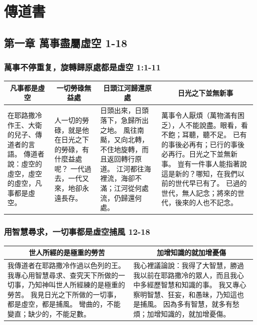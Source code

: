 \chapter{傳道書}

\section{第一章 萬事盡屬虛空 1-18}
\subsection{萬事不停重复，旋轉歸原處都是虛空  1:1-11}
\begin{table}[H]
\centering
\begin{tabular}{p{2.75cm}|p{2.50cm}|p{4.250cm}|p{}}\hline\hline
\multicolumn{1}{c|}{凡事都是虛空}&\multicolumn{1}{c|}{一切勞碌無益處}&\multicolumn{1}{c|}{日頭江河歸還原處}&\multicolumn{1}{c}{日光之下並無新事}\\\hline
在耶路撒冷作王、大衛的兒子、傳道者的言語。
傳道者說：虛空的虛空，虛空的虛空，凡事都是虛空。
&人一切的勞碌，就是他在日光之下的勞碌，有什麼益處呢？
一代過去，一代又來，地卻永遠長存。
&日頭出來，日頭落下，急歸所出之地。
風往南颳，又向北轉，不住地旋轉，而且返回轉行原道。
江河都往海裡流，海卻不滿；江河從何處流，仍歸還何處。
&萬事令人厭煩（萬物滿有困乏），人不能說盡。眼看，看不飽；耳聽，聽不足。
已有的事後必再有；已行的事後必再行。日光之下並無新事。
豈有一件事人能指著說這是新的？哪知，在我們以前的世代早已有了。
已過的世代，無人記念；將來的世代，後來的人也不記念。\\\hline
\end{tabular}
\end{table}

\subsection{用智慧尋求，一切事都是虛空捕風 12-18}
\begin{table}[H]
\centering
\begin{tabular}{p{9.25cm}|p{8.250cm}}\hline\hline
\multicolumn{1}{c|}{世人所經的是極重的勞苦}&\multicolumn{1}{c|}{加增知識的就加增憂傷}\\\hline
我傳道者在耶路撒冷作過以色列的王。
我專心用智慧尋求、查究天下所做的一切事，乃知神叫世人所經練的是極重的勞苦。
我見日光之下所做的一切事，都是虛空，都是捕風。
彎曲的，不能變直；缺少的，不能足數。 
&我心裡議論說：我得了大智慧，勝過我以前在耶路撒冷的眾人，而且我心中多經歷智慧和知識的事。
我又專心察明智慧、狂妄，和愚昧，乃知這也是捕風。
因為多有智慧，就多有愁煩；加增知識的，就加增憂傷。\\\hline
\end{tabular}
\end{table}

